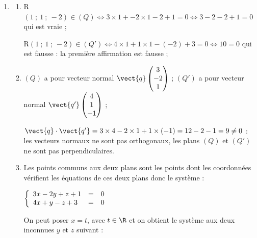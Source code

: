 \begin{enumerate}
Ce système n'a pas de solution. Donc le point D n'appartient pas au plan défini par les points A, B et C ou encore A, B, C et D ne sont pas coplanaires.
\item %
	\begin{enumerate}
		\item %
R$(1~;~1~;~-2) \in (Q) \iff 3 \times 1 + -2  \times1  - 2 +1 = 0 \iff 3 - 2 - 2 + 1 = 0$ qui est vraie ;
		
R$(1~;~1~;~-2) \in (Q') \iff 4 \times 1 + 1 \times 1  - (- 2) + 3 = 0 \iff 10 = 0$ qui est fausse : la première affirmation est fausse ;
		\item %
$(Q)$ a pour vecteur normal $\vect{q}\begin{pmatrix}3\\- 2\\1\end{pmatrix}$ ; 
$(Q')$ a pour vecteur normal $\vect{q'}\begin{pmatrix}4\\1\\- 1\end{pmatrix}$ ; 

$\vect{q} \cdot \vect{q'} = 3 \times  4 -2 \times  1 + 1 \times (-1) = 12 - 2 - 1 = 9 \ne 0$ : les vecteurs normaux ne sont pas orthogonaux, les plans $(Q)$ et $(Q')$ ne sont pas perpendiculaires.
		\item %

Les points communs aux deux plans sont les points dont les coordonnées vérifient les équations de ces deux plans donc le système :

$\left\{\begin{array}{l cl}
3x - 2y + z + 1 &=& 0\\
4x + y - z + 3 &=& 0
\end{array}\right.$

On peut poser $x = t$, avec $t \in \R$ et on obtient le système aux deux inconnues $y$ et $z$ suivant :


\end{enumerate}
\end{enumerate}
